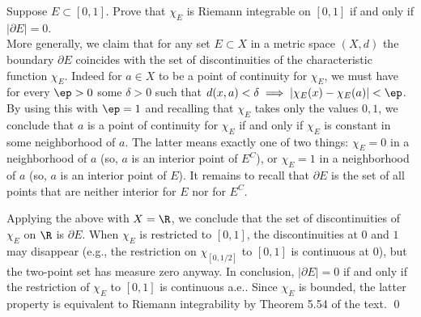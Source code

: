 \begin{hwsol}
Suppose $E \subset [0, 1]$. Prove that $\chi_E$ is Riemann integrable on $[0, 1]$ if and only if $|\partial E|=0$. \\

\pf More generally, we claim that for any set $E \subset X$ in a metric space $(X,d)$ the boundary $\partial E$ coincides with the set of discontinuities of the characteristic function $\chi_E$. Indeed for $a \in X$ to be a point of continuity for $\chi_E$, we must have for every $\ep > 0$ some $\delta > 0$ such that $d(x,a) < \delta \implies |\chi_E(x) - \chi_E(a)| < \ep$. By using this with $\ep= 1$ and recalling that $\chi_E$ takes only the values $0,1$, we conclude that $a$ is a point of continuity for $\chi_E$ if and only if $\chi_E$ is constant in some neighborhood of $a$. The latter means exactly one of two things: $\chi_E= 0$ in a neighborhood of $a$ (so, $a$ is an interior point of $E^C$), or $\chi_E= 1$ in a neighborhood of $a$ (so, $a$ is an interior point of $E$). It remains to recall that $\partial E$ is the set of all points that are neither interior for  $E$ nor for $E^C$. 

Applying the above with $X= \R$, we conclude that the set of discontinuities of $\chi_E$ on $\R$ is $\partial E$. When $\chi_E$ is restricted to $[0, 1]$, the discontinuities at $0$ and $1$ may disappear (e.g., the restriction on $\chi_{[0, 1/2]}$ to $[0, 1]$ is continuous at $0$), but the two-point set has measure zero anyway. In conclusion, $|\partial E|= 0$ if and only if the restriction of $\chi_E$ to $[0, 1]$ is continuous a.e.. Since $\chi_E$ is bounded, the latter property is equivalent to Riemann integrability by Theorem 5.54 of the text. \qed \\
\end{hwsol}


